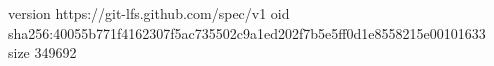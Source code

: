 version https://git-lfs.github.com/spec/v1
oid sha256:40055b771f4162307f5ac735502c9a1ed202f7b5e5ff0d1e8558215e00101633
size 349692
